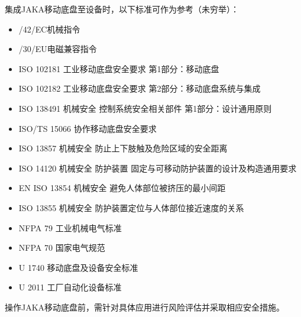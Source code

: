 \documentclass[a4paper,11pt,english,openany,oneside]{sphinxmanual}
\begin{document}
\sphinxAtStartPar
集成JAKA移动底盘至设备时，以下标准可作为参考（未穷举）：
\begin{itemize}
\item {} 
/42/EC机械指令

\item {} 
/30/EU电磁兼容指令

\item {} 
\sphinxAtStartPar
ISO 10218\sphinxhyphen{}1 工业移动底盘安全要求 第1部分：移动底盘

\item {} 
\sphinxAtStartPar
ISO 10218\sphinxhyphen{}2 工业移动底盘安全要求 第2部分：移动底盘系统与集成

\item {} 
\sphinxAtStartPar
ISO 13849\sphinxhyphen{}1 机械安全 控制系统安全相关部件 第1部分：设计通用原则

\item {} 
\sphinxAtStartPar
ISO/TS 15066 协作移动底盘安全要求

\item {} 
\sphinxAtStartPar
ISO 13857 机械安全 防止上下肢触及危险区域的安全距离

\item {} 
\sphinxAtStartPar
ISO 14120 机械安全 防护装置 固定与可移动防护装置的设计及构造通用要求

\item {} 
\sphinxAtStartPar
EN ISO 13854 机械安全 避免人体部位被挤压的最小间距

\item {} 
\sphinxAtStartPar
ISO 13855 机械安全 防护装置定位与人体部位接近速度的关系

\item {} 
\sphinxAtStartPar
NFPA 79 工业机械电气标准

\item {} 
\sphinxAtStartPar
NFPA 70 国家电气规范

\item {} 
\sphinxAtStartPar
U\sphinxhyphen{} 1740 移动底盘及设备安全标准

\item {} 
\sphinxAtStartPar
U\sphinxhyphen{} 2011 工厂自动化设备标准

\end{itemize}

\sphinxAtStartPar
操作JAKA移动底盘前，需针对具体应用进行风险评估并采取相应安全措施。
\end{document}
